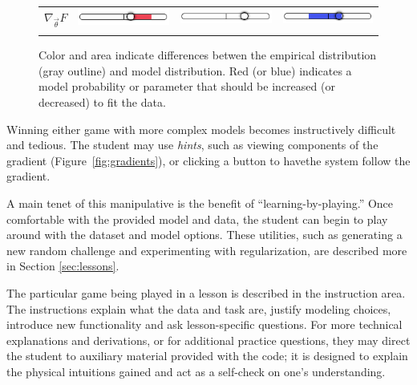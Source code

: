 \documentclass[11pt,letterpaper]{article}
\begin{document}
\begin{figure}[t]
\begin{tabular}{
>{\centering\arraybackslash}m{} 
>{\centering\arraybackslash}m{}
>{\centering\arraybackslash}m{}
>{\centering\arraybackslash}m{}}
$\nabla_{\vec{\theta}} F$ 
& \includegraphics[scale=.25]{images/goldilocks-gradient-small.PNG}
& \includegraphics[scale=.25]{images/goldilocks-gradient-justright.PNG}
& \includegraphics[scale=.25]{images/goldilocks-gradient-large.PNG}\\ \\ 

\end{tabular}
\caption{Color and area indicate differences betwen the empirical
  distribution (gray outline) and model distribution. Red (or blue)
  indicates a model probability or parameter that should be
  increased (or decreased) to fit the data.}
\label{fig:colorsize_inventory}
\end{figure}

Winning either game with more complex models becomes instructively
difficult and tedious. 
The student may use \textit{hints}, such as
viewing components of the gradient (Figure~\ref{fig:gradients}), or 
clicking a button to havethe system follow the gradient.  

A main tenet of this manipulative is the benefit of ``learning-by-playing.'' 
Once comfortable with the provided model and data, the student can begin to play 
around with the dataset and model options. These utilities, such as
generating a new random challenge and experimenting with regularization, 
are described more in Section \ref{sec:lessons}.

The particular game being played in a lesson is described in the
instruction area. The instructions explain what the data and task are, justify modeling
choices, introduce new functionality and ask lesson-specific questions. For more technical 
explanations and derivations, or for additional practice questions, 
they may direct the student to auxiliary material provided with the code; it is designed to explain 
the physical intuitions gained and act as a self-check on one's understanding. 
\end{document}
